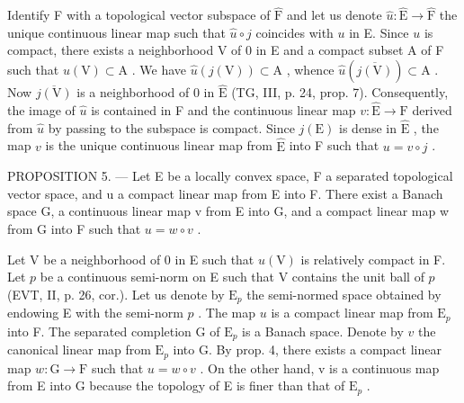 Identify F with a topological vector subspace of \(\widehat{\mathrm{F}}\) and let us denote \(\widehat{u}\colon \widehat{\mathrm{E}}\to \widehat{\mathrm{F}}\) the unique continuous linear map such that \(\widehat{u}\circ j\) coincides with \(u\) in E. Since \(u\) is compact, there exists a neighborhood V of 0 in E and a compact subset A of F such that \(u(\mathrm{V})\subset \mathrm{A}\) . We have \(\widehat{u}(j(\mathrm{V}))\subset \mathrm{A}\) , whence \(\widehat{u} (\overline{j(\mathrm{V})})\subset \mathrm{A}\) . Now \(\overline{j(\mathrm{V})}\) is a neighborhood of 0 in \(\widehat{\mathrm{E}}\) (TG, III, p. 24, prop. 7). Consequently, the image of \(\widehat{u}\) is contained in F and the continuous linear map \(v\colon \widehat{\mathrm{E}}\rightarrow \mathrm{F}\) derived from \(\widehat{u}\) by passing to the subspace is compact. Since \(j(\mathrm{E})\) is dense in \(\widehat{\mathrm{E}}\) , the map \(v\) is the unique continuous linear map from \(\widehat{\mathrm{E}}\) into F such that \(u = v\circ j\) .

PROPOSITION 5. --- Let E be a locally convex space, F a separated topological vector space, and u a compact linear map from E into F. There exist a Banach space G, a continuous linear map v from E into G, and a compact linear map w from G into F such that \(u = w \circ v\) .

Let V be a neighborhood of 0 in E such that \(u(\mathrm{V})\) is relatively compact in F. Let \(p\) be a continuous semi-norm on E such that V contains the unit ball of \(p\) (EVT, II, p. 26, cor.). Let us denote by \(\mathrm{E}_p\) the semi-normed space obtained by endowing E with the semi-norm \(p\) . The map \(u\) is a compact linear map from \(\mathrm{E}_p\) into F. The separated completion G of \(\mathrm{E}_p\) is a Banach space. Denote by \(v\) the canonical linear map from \(\mathrm{E}_p\) into G. By prop. 4, there exists a compact linear map \(w: \mathrm{G} \to \mathrm{F}\) such that \(u = w \circ v\) . On the other hand, v is a continuous map from E into G because the topology of E is finer than that of \(\mathrm{E}_p\) .

